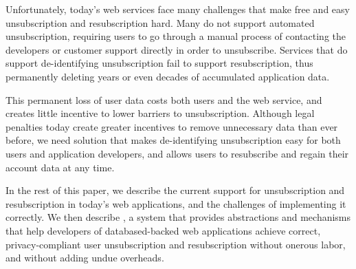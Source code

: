 Unfortunately, today's web services face many challenges that make free and easy unsubscription and
resubscription hard. Many do not support automated unsubscription, requiring users to go through a
manual process of contacting the developers or customer support directly in order to unsubscribe.
Services that do support de-identifying unsubscription fail to support resubscription, thus 
permanently deleting years or even decades of accumulated application data. 

This permanent loss of user data costs both users and the web service, and creates little incentive
to lower barriers to unsubscription.  Although legal penalties today create greater incentives to
remove unnecessary data than ever before, we need solution that makes de-identifying unsubscription
easy for both users and application developers, and allows users to resubscribe and regain their
account data at any time.
%

In the rest of this paper, we describe the current support for unsubscription and resubscription in
today's web applications, and the challenges of implementing it correctly.  We then describe \sys, a
system that provides abstractions and mechanisms that help developers of databased-backed web
applications achieve correct, privacy-compliant user unsubscription and resubscription without
onerous labor, and without adding undue overheads.
